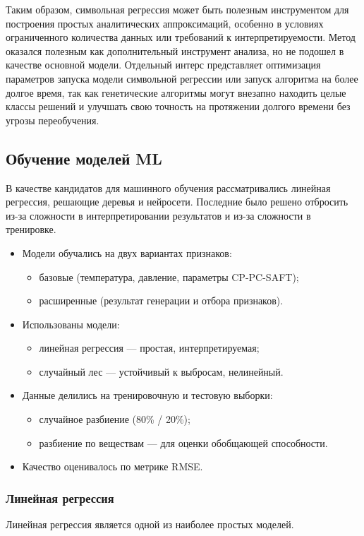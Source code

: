 \documentclass[a4paper,12pt]{article}
\begin{document}
    Таким образом, символьная регрессия может быть полезным инструментом для построения простых аналитических аппроксимаций, особенно в условиях ограниченного количества данных или требований к интерпретируемости. Метод оказался полезным как дополнительный инструмент анализа, но не подошел в качестве основной модели. Отдельный интерс представляет оптимизация параметров запуска модели символьной регрессии или запуск алгоритма на более долгое время, так как генетические алгоритмы могут внезапно находить целые классы решений и улучшать свою точность на протяжении долгого времени без угрозы переобучения. 

  \subsection{Обучение моделей ML}
    В качестве кандидатов для машинного обучения рассматривались линейная регрессия, решающие деревья и нейросети. Последние было решено отбросить из-за сложности в интерпретировании результатов и из-за сложности в тренировке.
    \begin{itemize}
      \item Модели обучались на двух вариантах признаков:
      \begin{itemize}
        \item базовые (температура, давление, параметры CP-PC-SAFT);
        \item расширенные (результат генерации и отбора признаков).
      \end{itemize}
      \item Использованы модели:
      \begin{itemize}
        \item линейная регрессия --- простая, интерпретируемая;
        \item случайный лес --- устойчивый к выбросам, нелинейный.
      \end{itemize}
      \item Данные делились на тренировочную и тестовую выборки:
      \begin{itemize}
        \item случайное разбиение (80\% / 20\%);
        \item разбиение по веществам — для оценки обобщающей способности.
      \end{itemize}
      \item Качество оценивалось по метрике RMSE.
    \end{itemize}

    \subsubsection{Линейная регрессия}
      Линейная регрессия является одной из наиболее простых моделей.
\end{document}
